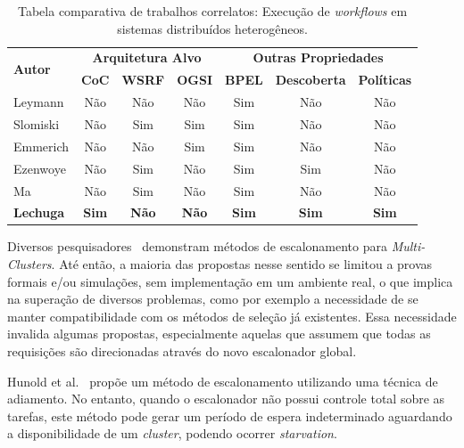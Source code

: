 \documentclass[12pt]{report} %
\begin{document}
	\begin{table}[!htb]
	    \caption{Tabela comparativa de trabalhos correlatos: Execução de \textit{workflows} em sistemas distribuídos heterogêneos.}
	    \centering
	    \small
	    \begin{tabular}{l||c|c|c|c|c|c} %
		\hline
		    \multirow{2}{2cm}{\textbf{Autor}} & \multicolumn{3}{c|}{\textbf{Arquitetura Alvo}} & \multicolumn{3}{c}{\textbf{Outras Propriedades}} \\
		\cline{2-7}
		    & \textbf{CoC} & \textbf{WSRF} & \textbf{OGSI} & \textbf{BPEL} & \textbf{Descoberta} & \textbf{Políticas} \\

		\hline
		\hline

		Leymann  & Não & Não & Não & Sim & Não & Não \\ 
		Slomiski & Não & Sim & Sim & Sim & Não & Não \\
		Emmerich & Não & Não & Sim & Sim & Não & Não \\
		Ezenwoye & Não & Sim & Não & Sim & Sim & Não \\
		Ma 	 & Não & Sim & Não & Sim & Não  & Não \\
		\textbf{Lechuga} & \textbf{Sim} & \textbf{Não} & \textbf{Não} & \textbf{Sim} & \textbf{Sim} & \textbf{Sim} \\ 

		\hline
	    \end{tabular}
	    \label{tabela:CorrelatosWF}
	\end{table}
	
	Diversos pesquisadores~\cite{Chau03:2,Suter07,Bauer07,Rauber08,Antonio09} demonstram métodos de escalonamento para \textit{Multi-Clusters}.
	Até então, a maioria das propostas nesse sentido se limitou a provas formais e/ou simulações, sem implementação em um ambiente real, o que implica na superação de diversos problemas, como por exemplo a necessidade de se manter compatibilidade com os métodos de seleção já existentes.
	Essa necessidade invalida algumas propostas, especialmente aquelas que assumem que todas as requisições são direcionadas através do novo escalonador global\cite{Antonio09,Bauer07,Suter07}.

	Hunold et al.~\cite{Rauber08} propõe um método de escalonamento utilizando uma técnica de adiamento.
	No entanto, quando o escalonador não possui controle total sobre as tarefas, este método pode gerar um período de espera indeterminado aguardando a disponibilidade de um \textit{cluster}, podendo ocorrer \textit{starvation}.
	
\end{document}
